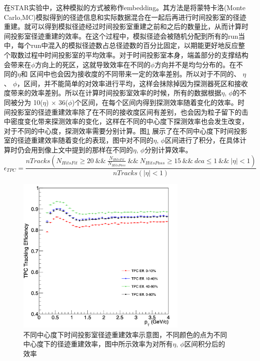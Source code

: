 在STAR实验中，这种模拟的方式被称作embedding。其方法是将蒙特卡洛(Monte Carlo,MC)模拟得到的径迹信息和实际数据混合在一起后再进行时间投影室的径迹重建。就可以得到模拟径迹经过时间投影室重建之前和之后的数量比，从而计算时间投影室径迹重建的效率。在这个过程中，模拟径迹会被随机分配到所有的run当中，每个run中混入的模拟径迹数占总径迹数的百分比固定，以期能更好地反应整个取数过程中时间投影室的平均效率。对于时间投影室本身，端盖部分的支撑结构会带来在$\phi$方向上的死区，这就导致效率在不同的$\phi$方向并不是均匀分布的。在不同的$\eta$和 \pt 区间中也会因为接收度的不同带来一定的效率差别。所以对于不同的\pt 、 $\eta$、 $\phi$，区间，并不能简单的对效率进行平均，这样会抹除掉因为探测器死区和接收度带来的效率差别。所以在计算时间投影室效率的时候，所有的数据根据$\eta$, $\phi$的不同被分为 10($\eta$) $\times$ 36($\phi$)个区间，在每个区间内得到探测效率随着\pt 变化的效率。时间投影室的径迹重建效率除了在不同的接收度区间有差别，也会因为粒子留下的击中密度变化带来探测效率的变化，这样在不同的中心度下探测效率也会发生改变，对于不同的中心度，探测效率需要分别计算。图\ref{fig:TPCTracking} 展示了在不同中心度下时间投影室的径迹重建效率随着\pt 变化的表现，图中对不同的$\eta$, $\phi$区间进行了积分，在具体计算时仍会用到像上文中提到的那样在不同的$\eta$, $\phi$分别计算效率。
\begin{equation}
    \label{eq:TPC_eff}
    \epsilon_{TPC} = \frac{ nTracks( N_{HitsFit} \geq 20~\&\&~\frac{N_{HitsFit}}{N_{HitsPoss}}~\&\&~N_{HitsPoss}\geq15~\&\&~dca\leq1~\&\&~|\eta| < 1 ) }{nTracks(|\eta| < 1)}
\end{equation}

\begin{figure}[htb]
    \begin{center}
    \includegraphics[width=0.75\textwidth,clip]{figures/Chapter4/TPCTracking.png}
    \end{center}
    \caption[不同中心度下时间投影室径迹重建效率示意图]{不同中心度下时间投影室径迹重建效率示意图，不同颜色的点为不同中心度下的径迹重建效率，图中所示效率为对所有$\eta$, $\phi$区间积分后的效率}
    \label{fig:TPCTracking}
\end{figure}

